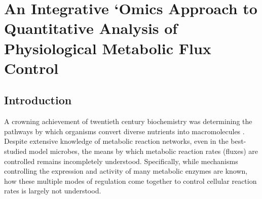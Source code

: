 \chapter{An Integrative `Omics Approach to Quantitative Analysis of Physiological Metabolic Flux Control\label{ch:simmer}}



\section{Introduction}

A crowning achievement of twentieth century biochemistry was determining the pathways by which organisms convert diverse nutrients into macromolecules \cite{Caspi:2014je}. Despite extensive knowledge of metabolic reaction networks, even in the best-studied model microbes, the means by which metabolic reaction rates (fluxes) are controlled remains incompletely understood. Specifically, while mechanisms controlling the expression and activity of many metabolic enzymes are known, how these multiple modes of regulation come together to control cellular reaction rates is largely not understood.

